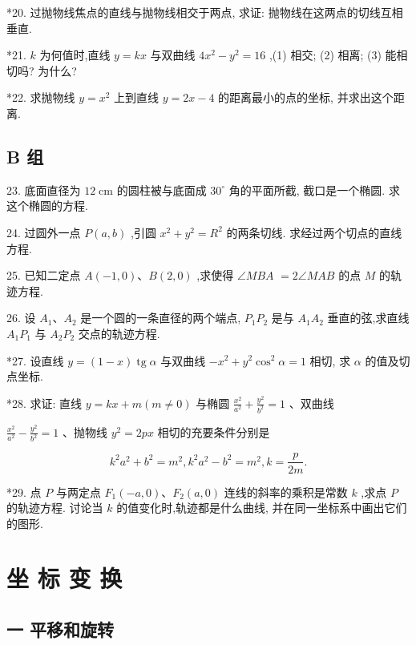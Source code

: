 \documentclass[lang=cn,newtx,12pt,scheme=chinese]{elegantbook}
\begin{document}
*20. 过抛物线焦点的直线与抛物线相交于两点, 求证: 抛物线在这两点的切线互相垂直.

*21. \(k\) 为何值时,直线 \(y = {kx}\) 与双曲线 \(4{x}^{2} - {y}^{2} = {16}\) ,(1) 相交; (2) 相离; (3) 能相切吗? 为什么?

*22. 求抛物线 \(y = {x}^{2}\) 上到直线 \(y = {2x} - 4\) 的距离最小的点的坐标, 并求出这个距离.

\section*{B 组}

23. 底面直径为 \({12}\mathrm{\;{cm}}\) 的圆柱被与底面成 \({30}^{ \circ }\) 角的平面所截, 截口是一个椭圆. 求这个椭圆的方程.

24. 过圆外一点 \(P\left( {a,b}\right)\) ,引圆 \({x}^{2} + {y}^{2} = {R}^{2}\) 的两条切线. 求经过两个切点的直线方程.

25. 已知二定点 \(A\left( {-1,0}\right) \text{、}B\left( {2,0}\right)\) ,求使得 \(\angle {MBA}\) \(= 2\angle {MAB}\) 的点 \(M\) 的轨迹方程.

26. 设 \({A}_{1}\text{、}{A}_{2}\) 是一个圆的一条直径的两个端点, \({P}_{1}{P}_{2}\) 是与 \({A}_{1}{A}_{2}\) 垂直的弦,求直线 \({A}_{1}{P}_{1}\) 与 \({A}_{2}{P}_{2}\) 交点的轨迹方程.

*27. 设直线 \(y = \left( {1 - x}\right) \operatorname{tg}\alpha\) 与双曲线 \(- {x}^{2} + {y}^{2}{\cos }^{2}\alpha = 1\) 相切, 求 \(\alpha\) 的值及切点坐标.

*28. 求证: 直线 \(y = {kx} + m\left( {m \neq 0}\right)\) 与椭圆 \(\frac{{x}^{2}}{{a}^{2}} + \frac{{y}^{2}}{{b}^{2}} = 1\) 、双曲线

\(\frac{{x}^{2}}{{a}^{2}} - \frac{{y}^{2}}{{b}^{2}} = 1\) 、抛物线 \({y}^{2} = {2px}\) 相切的充要条件分别是

\[
    {k}^{2}{a}^{2} + {b}^{2} = {m}^{2},{k}^{2}{a}^{2} - {b}^{2} = {m}^{2},k = \frac{p}{2m}.
\]

*29. 点 \(P\) 与两定点 \({F}_{1}\left( {-a,0}\right) \text{、}{F}_{2}\left( {a,0}\right)\) 连线的斜率的乘积是常数 \(k\) ,求点 \(P\) 的轨迹方程. 讨论当 \(k\) 的值变化时,轨迹都是什么曲线, 并在同一坐标系中画出它们的图形.

\chapter{坐 标 变 换}

\section*{一 \text{ }平移和旋转}
\end{document}

